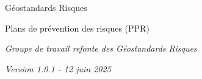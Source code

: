 \documentclass[a4paper,12pt]{article}
\begin{document}
\begin{titlepage}
    {\marianne\fontsize{27pt}{26pt}\selectfont\color{etatbleu} Géostandards Risques\par}

    \vspace{0.5cm}

    {\marianne\large\color{etatbleu} Plans de prévention des risques (PPR)\par}

    \vfill

    {\marianne\small\itshape Groupe de travail refonte des Géostandards Risques\par}
    \vspace{0.3cm}
    {\marianne\small\itshape Version 1.0.1 - 12 juin 2025\par}



\end{titlepage}

\newpage
\thispagestyle{empty}
\mbox{}
\newpage
\end{document}
